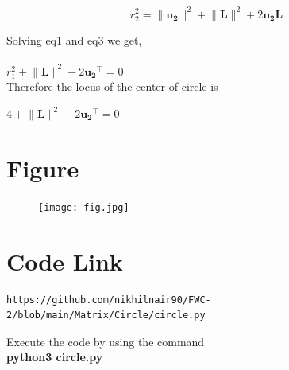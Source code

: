 \documentclass[journal,12pt,twocolumn]{IEEEtran}
\let\vec\mathbf
\begin{document}
\begin{equation}
r_2^2=\lVert{ \vec{u_2}}\rVert^2+\lVert{ \vec{L}}\rVert^2+2\vec{u_2}\vec{ L}
\end{equation}

Solving eq1 and eq3 we get,\\
\\

$r_1^2+\lVert{\vec{L}}\rVert^2-2\vec{u_2}^{\top}=0$
\\

Therefore the locus of the center of circle is
\\
\begin{center}
$ 4+\lVert{\vec{L}}\rVert^2-2\vec{u_2}^{\top}= 0$
\end{center}

\section{\textbf{Figure}}
\begin{figure}[h]
    \centering
\texttt{[image: fig.jpg]}
    \label{fig:my_label}
\end{figure}


\section{\textbf{Code Link}}

\begin{lstlisting}
https://github.com/nikhilnair90/FWC-2/blob/main/Matrix/Circle/circle.py
\end{lstlisting}
Execute the code by using the command\\
\textbf{python3 circle.py}
\end{document}
